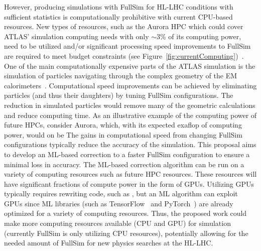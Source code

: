 \documentclass[letter, USenglish, 11pt, subfigure]{article}
\begin{document}
However, producing simulations with FullSim for HL-LHC conditions with sufficient statistics is computationally prohibitive with current CPU-based resources. New types of resources, such as the Aurora HPC which could cover ATLAS' simulation computing needs with only $\sim$3\% of its computing power, need to be utilized and/or significant processing speed improvements to FullSim are required to meet budget constraints (see Figure~\ref{fig:currentComputing})~\cite{computingCDR}. One of the main computationally expensive parts of the ATLAS simulation is the simulation of particles navigating through the complex geometry of the EM calorimeters~\cite{Muskinja:2753974}. Computational speed improvements can be achieved by eliminating particles (and thus their daughters) by tuning FullSim configurations. The reduction in simulated particles would remove many of the geometric calculations and reduce computing time.
As an illustrative example of the computing power of future HPCs, consider Aurora, which, with its expected exaflop of computing power, would on be 
The gains in computational speed from changing FullSim configurations typically reduce the accuracy of the simulation. This proposal aims to develop an ML-based correction to a faster FullSim configuration to ensure a minimal loss in accuracy. The ML-based correction algorithm can be run on a variety of computing resources such as future HPC resources. These resources will have significant fractions of compute power in the form of GPUs. Utilizing GPUs typically requires rewriting code, such as \GEANT, but an ML algorithm can exploit GPUs since ML libraries (such as TensorFlow~\cite{tensorflow2015-whitepaper} and PyTorch~\cite{NEURIPS2019_9015}) are already optimized for a variety of computing resources. Thus, the proposed work could make more computing resources available (CPU and GPU) for simulation (currently FullSim is only utilizing CPU resources), potentially allowing for the needed amount of FullSim for new physics searches at the HL-LHC. 

 
\end{document}

